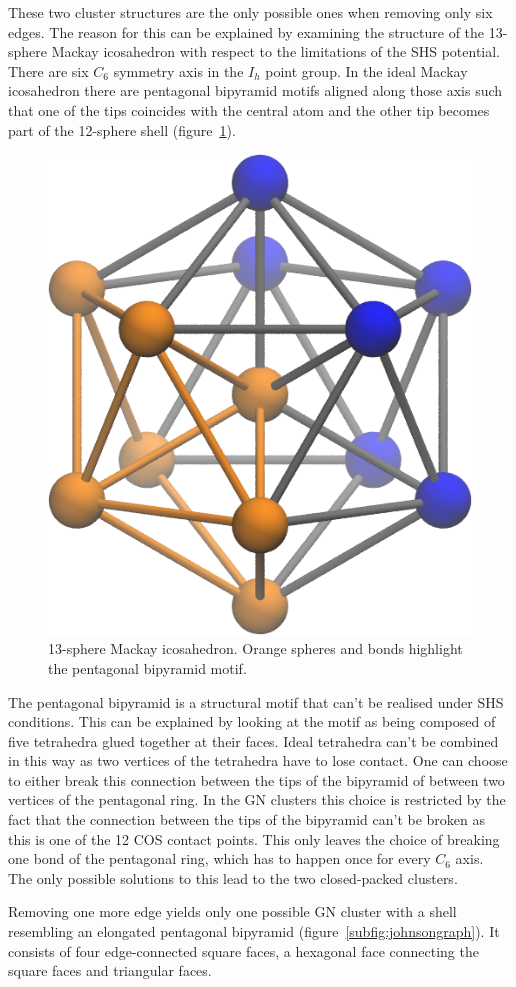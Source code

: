 These two cluster structures are the only possible ones when removing only six
edges. The reason for this can be explained by examining the structure of the
13-sphere Mackay icosahedron with respect to the limitations of the \ac{SHS}
potential. There are six $C_6$ symmetry axis in the $I_h$ point group. In the
ideal Mackay icosahedron there are pentagonal bipyramid motifs aligned along
those axis such that one of the tips coincides with the central atom and the
other tip becomes part of the 12-sphere shell (figure~\ref{fig:icopent}). 

\begin{figure}
    \centering
    \includegraphics[width=.4\textwidth]{gregory-newton/icopent.png}
    \caption{13-sphere Mackay icosahedron. Orange spheres and bonds highlight
    the pentagonal bipyramid motif.}
    \label{fig:icopent}
\end{figure}

The pentagonal bipyramid is a structural motif that can't be realised under
\ac{SHS} conditions. This can be explained by looking at the motif as being
composed of five tetrahedra glued together at their faces. Ideal tetrahedra
can't be combined in this way as two vertices of the tetrahedra have to lose
contact.\autocite{Hayes_ScienceStickySpheres_2012} One can choose to either
break this connection between the tips of the bipyramid of between two vertices
of the pentagonal ring. In the \ac{GN} clusters this choice is restricted by
the fact that the connection between the tips of the bipyramid can't be broken
as this is one of the 12 \ac{COS} contact points.  This only leaves the choice
of breaking one bond of the pentagonal ring, which has to happen once for every
$C_6$ axis. The only possible solutions to this lead to the two closed-packed
clusters.

Removing one more edge yields only one possible \ac{GN} cluster with a shell
resembling an elongated pentagonal bipyramid
(figure~\ref{subfig:johnsongraph}). It consists of four edge-connected square
faces, a hexagonal face connecting the square faces and triangular faces.


